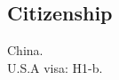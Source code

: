 \documentclass[margin, 10pt]{res} %
\begin{document}
\begin{resume}


\section{Citizenship} 
China. \\
U.S.A visa: H1-b.

\end{resume}
\end{document}
